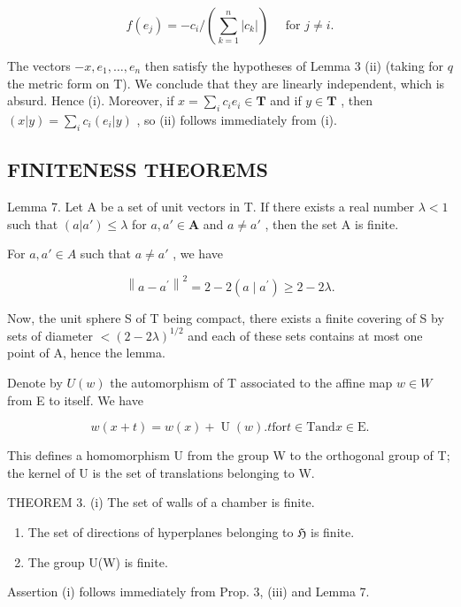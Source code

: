 \[
f \left(e _ {j}\right) = - c _ {i} / \left(\sum_ {k = 1} ^ {n} \left| c _ {k} \right|\right) \quad \text { for } j \neq i.
\]

The vectors \(-x, e_1, \ldots, e_n\) then satisfy the hypotheses of Lemma 3 (ii) (taking for \(q\) the metric form on T). We conclude that they are linearly independent, which is absurd. Hence (i). Moreover, if \(x = \sum_{i} c_i e_i \in \mathbf{T}\) and if \(y \in \mathbf{T}\) , then \((x|y) = \sum_{i} c_i (e_i | y)\) , so (ii) follows immediately from (i).

\subsection{FINITENESS THEOREMS}

Lemma 7. Let A be a set of unit vectors in T. If there exists a real number \(\lambda < 1\) such that \((a|a') \leqslant \lambda\) for \(a, a' \in \mathbf{A}\) and \(a \neq a'\) , then the set A is finite.

For \(a, a' \in A\) such that \(a \neq a'\) , we have

\[
\left\| a - a ^ {\prime} \right\| ^ {2} = 2 - 2 (a \mid a ^ {\prime}) \geqslant 2 - 2 \lambda .
\]

Now, the unit sphere S of T being compact, there exists a finite covering of S by sets of diameter \(<(2-2\lambda)^{1/2}\) and each of these sets contains at most one point of A, hence the lemma.

Denote by \(U(w)\) the automorphism of T associated to the affine map \(w \in W\) from E to itself. We have

\[
w (x + t) = w (x) + \operatorname{U} (w). t \text {for} t \in \mathrm{T} \text {and} x \in \mathrm{E}.
\]

This defines a homomorphism U from the group W to the orthogonal group of T; the kernel of U is the set of translations belonging to W.

THEOREM 3. (i) The set of walls of a chamber is finite.

\begin{enumerate}
\def\labelenumi{(\roman{enumi})}
\setcounter{enumi}{1}
\item
  The set of directions of hyperplanes belonging to \(\mathfrak{H}\) is finite.
\item
  The group U(W) is finite.
\end{enumerate}

Assertion (i) follows immediately from Prop. 3, (iii) and Lemma 7.

